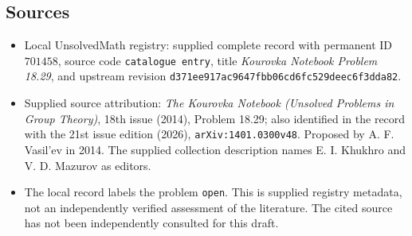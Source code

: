 \documentclass[11pt]{article}
\begin{document}
\subsection{Sources}
\begin{itemize}
\item Local UnsolvedMath registry: supplied complete record with permanent ID \(701458\), source code \texttt{catalogue entry}, title \emph{Kourovka Notebook Problem 18.29}, and upstream revision \texttt{d371ee917ac9647fbb06cd6fc529deec6f3dda82}.
\item Supplied source attribution: \emph{The Kourovka Notebook (Unsolved Problems in Group Theory)}, 18th issue (2014), Problem 18.29; also identified in the record with the 21st issue edition (2026), \texttt{arXiv:1401.0300v48}. Proposed by A. F. Vasil'ev in 2014. The supplied collection description names E. I. Khukhro and V. D. Mazurov as editors.
\item The local record labels the problem \texttt{open}. This is supplied registry metadata, not an independently verified assessment of the literature. The cited source has not been independently consulted for this draft.
\end{itemize}
\end{document}

